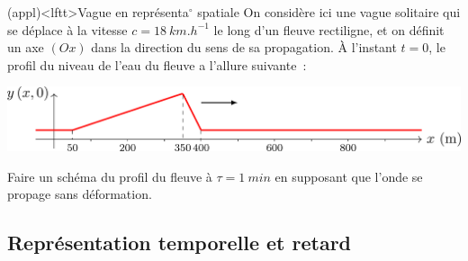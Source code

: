 \documentclass[../../main/main.tex]{subfiles}
\begin{document}
\begin{tcb*}(appl)<lftt>{Vague en représenta$^\circ$ spatiale}
	On considère ici une vague solitaire qui se déplace à la vitesse $\boxed{c =
			\SI{18}{km.h^{-1}}}$ le long d'un fleuve rectiligne, et on définit un axe
	$(Ox)$ dans la direction du sens de sa propagation.
	\smallbreak
	À l'instant $t=0$, le profil du niveau de l'eau du fleuve a l'allure
	suivante~:
	\begin{center}
		\includegraphics[width=0.8\linewidth]{rep_spa-masc_a}
	\end{center}
	Faire un schéma du profil du fleuve à $\tau = \SI{1}{min}$ en supposant que
	l'onde se propage sans déformation.
	\tcblower
	\begin{center}
	\end{center}
\end{tcb*}

\subsection{Représentation temporelle et retard}
\end{document}
